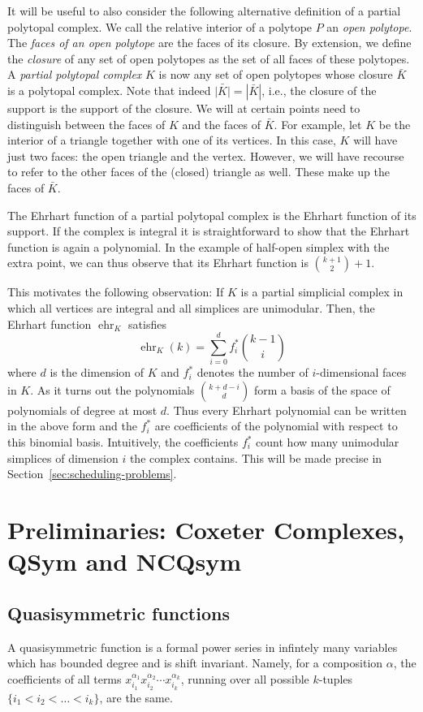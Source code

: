 \documentclass[12pt,reqno]{amsart}
\numberwithin{definition}{section}
\theoremstyle{definition}
\newcommand{\ehr}{\operatorname{ehr}}
\begin{document}
It will be useful to also consider the following alternative definition of a partial polytopal complex. We call the relative interior of a polytope $P$ an \emph{open polytope}. The \emph{faces of an open polytope} are the faces of its closure. By extension, we define the \emph{closure} of any set of open polytopes as the set of all faces of these polytopes. A \emph{partial polytopal complex} $K$ is now any set of open polytopes whose closure $\bar{K}$ is a polytopal complex. Note that indeed $\bar{|K|}=|\bar{K}|$, i.e., the closure of the support is the support of the closure. We will at certain points need to distinguish between the faces of $K$ and the faces of $\bar{K}$. For example, let $K$ be the interior of a triangle together with one of its vertices. In this case, $K$ will have just two faces: the open triangle and the vertex. However, we will have recourse to refer to the other faces of the (closed) triangle as well. These make up the faces of $\bar{K}$.

The Ehrhart function of a partial polytopal complex is the Ehrhart function of its support. If the complex is integral it is straightforward to show that the Ehrhart function is again a polynomial. In the example of half-open simplex with the extra point, we can thus observe that its Ehrhart function is $\binom{k+1}{2} + 1$.

This motivates the following observation: If $K$ is a partial simplicial complex in which all vertices are integral and all simplices are unimodular. Then, the Ehrhart function $\ehr_K$ satisfies
\[
  \ehr_K(k) = \sum_{i=0}^d f_i^* \binom{k-1}{i}
\]
where $d$ is the dimension of $K$ and $f_i^*$ denotes the number of $i$-dimensional faces in $K$. As it turns out the polynomials $\binom{k+d-i}{d}$ form a basis of the space of polynomials of degree at most $d$. Thus every Ehrhart polynomial can be written in the above form and the $f_i^*$ are coefficients of the polynomial with respect to this binomial basis. Intuitively, the coefficients $f_i^*$ count how many unimodular simplices of dimension $i$ the complex contains. This will be made precise in Section~\ref{sec:scheduling-problems}.

\section{Preliminaries: Coxeter Complexes, QSym and NCQsym}
\label{sec:prelim-qsym}

\subsection{Quasisymmetric functions}
A quasisymmetric function is a formal power series in infintely many
variables which has bounded degree and is shift invariant.  Namely, for
a composition $\alpha$, the coefficients of all terms
$x_{i_1}^{\alpha_1}x_{i_2}^{\alpha_2} \cdots x_{i_k}^{\alpha_k}$,
running over all possible $k$-tuples $\{i_1 < i_2 < \ldots < i_k \}$, are
the same.
\end{document}
